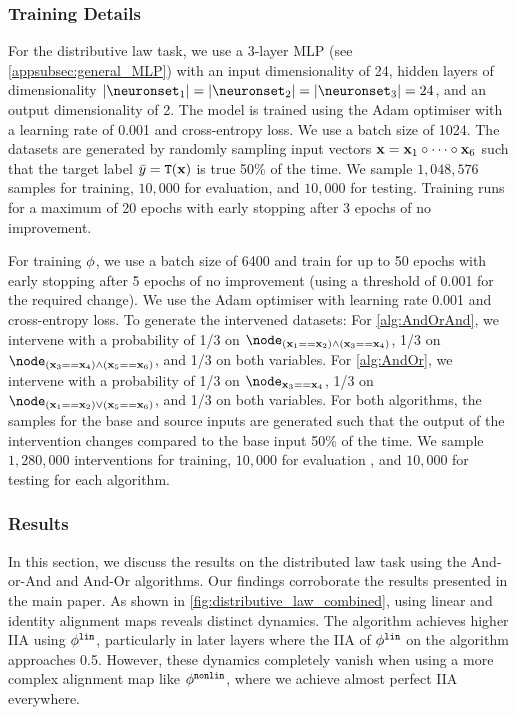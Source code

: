 \subsubsection{Training Details}\label{app:dl_training_details}
For the distributive law task, we use a 3-layer MLP (see \cref{appsubsec:general_MLP}) with an input dimensionality of 24, hidden layers of dimensionality $\lvert \neuronset_{1} \rvert = \lvert \neuronset_{2} \rvert =\lvert \neuronset_{3} \rvert = 24$, and an output dimensionality of 2. The model is trained using the Adam optimiser with a learning rate of 0.001 and cross-entropy loss. We use a batch size of 1024. The datasets are generated by randomly sampling input vectors $\mathbf{x} = \mathbf{x}_1 \circ \dots \circ \mathbf{x}_6$ such that the target label $\bar{y} = \mathtt{T}(\mathbf{x})$ is true 50\% of the time. We sample $1{,}048{,}576$ samples for training, $10{,}000$ for evaluation, and $10{,}000$ for testing. Training runs for a maximum of 20 epochs with early stopping after 3 epochs of no improvement.

For training $\phi$, we use a batch size of 6400 and train for up to 50 epochs with early stopping after 5 epochs of no improvement (using a threshold of 0.001 for the required change). 
We use the Adam optimiser with learning rate 0.001 and cross-entropy loss.
To generate the intervened datasets:
For \cref{alg:AndOrAnd}, we intervene with a probability of 1/3 on $\node_{(\bx_1\isequal\bx_2)\land(\bx_3\isequal\bx_4)}$, 1/3 on $\node_{(\bx_3\isequal\bx_4)\land(\bx_5\isequal\bx_6)}$, and 1/3 on both variables.
For \cref{alg:AndOr}, we intervene with a probability of 1/3 on $\node_{\bx_3\isequal\bx_4}$, 1/3 on $\node_{(\bx_1\isequal\bx_2)\lor(\bx_5\isequal\bx_6)}$, and 1/3 on both variables.
For both algorithms, the samples for the base and source inputs are generated such that the output of the intervention changes compared to the base input 50\% of the time. We sample $1{,}280{,}000$ interventions for training, $10{,}000$ for evaluation , and $10{,}000$ for testing for each algorithm.

\subsubsection{Results}\label{app:dl_results}

In this section, we discuss the results on the distributed law task using the And-or-And and And-Or algorithms. 
Our findings corroborate the results presented in the main paper.
As shown in \cref{fig:distributive_law_combined}, using linear and identity alignment maps reveals distinct dynamics. 
The \algandor algorithm achieves higher IIA using $\phi^{\mathtt{lin}}$, particularly in later layers where the IIA of $\phi^{\mathtt{lin}}$ on the \alganorand algorithm approaches 0.5. 
However, these dynamics completely vanish when using a more complex alignment map like $\phi^{\mathtt{nonlin}}$, where we achieve almost perfect IIA everywhere.

